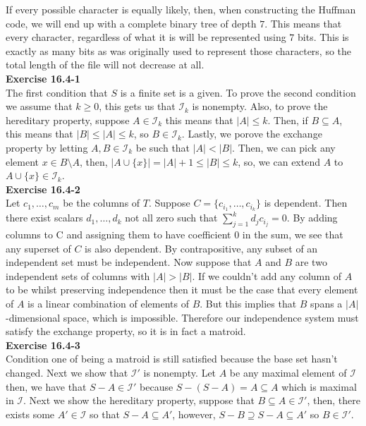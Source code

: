 \documentclass{article}
\begin{document}
If every possible character is equally likely, then, when constructing the Huffman code, we will end up with a complete binary tree of depth $7$. This means that every character, regardless of what it is will be represented using $7$ bits. This is exactly as many bits as was originally used to represent those characters, so the total length of the file will not decrease at all.\\

\noindent\textbf{Exercise 16.4-1}\\

The first condition that $S$ is a finite set is a given. To prove the second condition we assume that $k\ge 0$, this gets us that $\mathcal{I}_k$ is nonempty. Also, to prove the hereditary property, suppose $A\in \mathcal{I}_k$ this means that $|A| \le k$. Then, if $B\subseteq A$, this means that $|B| \le |A| \le k$, so $B\in \mathcal{I}_k$. Lastly, we porove the exchange property by letting $A,B\in\mathcal{I}_k$ be such that $|A|<|B|$. Then, we can pick any element $x \in B\setminus A$, then, $|A\cup\{x\}|  = |A|+1 \le |B| \le k$, so, we can extend $A$ to $A\cup \{x\}\in \mathcal{I}_k$.\\

\noindent\textbf{Exercise 16.4-2}\\

Let $c_1, \ldots, c_m$ be the columns of $T$.  Suppose $C = \{c_{i_1}, \ldots, c_{i_k}\}$ is dependent.  Then there exist scalars $d_1, \ldots , d_k$ not all zero such that $\sum_{j=1}^k d_j c_{i_j} = 0$.  By adding columns to C and assigning them to have coefficient 0 in the sum, we see that any superset of $C$ is also dependent.  By contrapositive, any subset of an independent set must be independent.  Now suppose that $A$ and $B$ are two independent sets of columns with $|A| > |B|$.  If we couldn't add any column of $A$ to be whilst preserving independence then it must be the case that every element of $A$ is a linear combination of elements of $B$.  But this implies that $B$ spans a $|A|$-dimensional space, which is impossible.  Therefore our independence system must satisfy the exchange property, so it is in fact a matroid. \\

\noindent\textbf{Exercise 16.4-3}\\

Condition one of being a matroid is still satisfied because the base set hasn't changed. Next we show that $\mathcal{I}'$ is nonempty. Let $A$ be any maximal element of $\mathcal{I}$ then, we have that $S - A \in \mathcal{I}'$ because $S - (S-A) = A\subseteq A$ which is maximal in $\mathcal{I}$. Next we show the hereditary property, suppose that $B \subseteq A \in \mathcal{I}'$, then, there exists some $A'\in\mathcal{I}$ so that $S - A \subseteq A'$, however, $S-B \supseteq S-A \subseteq A'$ so $B\in \mathcal{I}'$.
\end{document}

